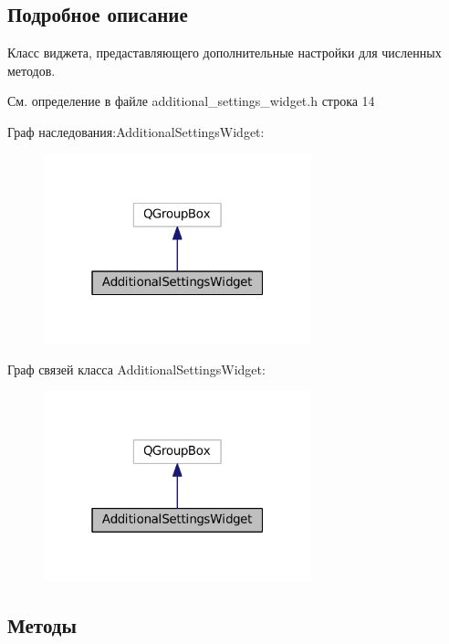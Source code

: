 \subsection{Подробное описание}
Класс виджета, предаставляющего дополнительные настройки для численных методов. 

См. определение в файле additional\+\_\+settings\+\_\+widget.\+h строка 14



Граф наследования\+:Additional\+Settings\+Widget\+:
\nopagebreak
\begin{figure}[H]
\begin{center}
\leavevmode
\includegraphics[width=220pt]{class_additional_settings_widget__inherit__graph}
\end{center}
\end{figure}


Граф связей класса Additional\+Settings\+Widget\+:
\nopagebreak
\begin{figure}[H]
\begin{center}
\leavevmode
\includegraphics[width=220pt]{class_additional_settings_widget__coll__graph}
\end{center}
\end{figure}


\subsection{Методы}
\hypertarget{class_additional_settings_widget_aaa678b544facc924f555b15e5640b21a}{}\label{class_additional_settings_widget_aaa678b544facc924f555b15e5640b21a} 
